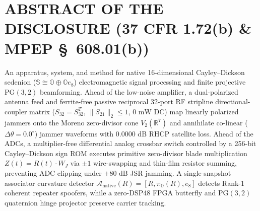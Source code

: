 \documentclass[12pt,letterpaper]{article}
\begin{document}
\section*{ABSTRACT OF THE DISCLOSURE (37 CFR 1.72(b) \& MPEP \S\ 608.01(b))}
An apparatus, system, and method for native 16-dimensional Cayley--Dickson sedenion ($\mathbb{S} \cong \mathbb{O} \oplus \mathbb{O}e_8$) electromagnetic signal processing and finite projective $\mathrm{PG}(3,2)$ beamforming. Ahead of the low-noise amplifier, a dual-polarized antenna feed and ferrite-free passive reciprocal 32-port RF stripline directional-coupler matrix ($S_{32} = S_{32}^T$, $\|S_{21}\|_2 \le 1$, $0\text{ mW}$ DC) map linearly polarized jammers onto the Moreno zero-divisor cone $V_2(\mathbb{R}^7)$ and annihilate co-linear ($\Delta\theta = 0.0^\circ$) jammer waveforms with $0.0000\text{ dB}$ RHCP satellite loss. Ahead of the ADCs, a multiplier-free differential analog crossbar switch controlled by a 256-bit Cayley--Dickson sign ROM executes primitive zero-divisor blade multiplication $Z(t) = R(t)\cdot W_J$ via $\pm 1$ wire-swapping and thin-film resistor summing, preventing ADC clipping under $+80\text{ dB}$ JSR jamming. A single-snapshot associator curvature detector $\mathcal{A}_{\mathrm{native}}(R) = [R, \pi_{\mathbb{O}}(R), e_8]$ detects Rank-1 coherent repeater spoofers, while a zero-DSP48 FPGA butterfly and $\mathrm{PG}(3,2)$ quaternion hinge projector preserve carrier tracking.
\end{document}

